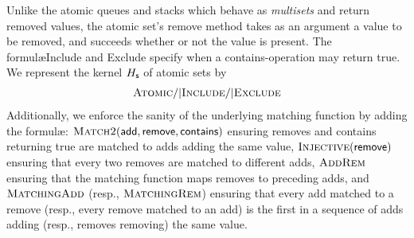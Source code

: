 \begin{example}

  Unlike the atomic queues and stacks which behave as \emph{multisets} and
  return removed values, the atomic set's {\sf remove} method takes as an
  argument a value to be removed, and succeeds whether or not the value is
  present. The formul\ae {\sc Include} and {\sc Exclude} specify when a {\sf
  contains}-operation may return {\sf true}. We represent the kernel $H_{\sf s}$
  of atomic sets by  
  \begin{align*}
    \textsc{Atomic} /| \textsc{Include} /| \textsc{Exclude}
  \end{align*}
  Additionally, we enforce the sanity of the underlying matching function by
  adding the formul\ae: $\textsc{Match2}({\sf add},{\sf
  remove},{\sf contains})$ ensuring removes and contains returning true
  are matched to adds adding the same value, $\textsc{Injective}({\sf remove})$ 
  ensuring that every two removes are matched to different adds,
  $\textsc{AddRem}$ ensuring that the matching function maps removes to preceding
  adds, and 
  $\textsc{MatchingAdd}$ (resp., $\textsc{MatchingRem}$) ensuring that every add matched to a remove
  (resp., every remove matched to an add) is the first in a sequence of adds adding 
  (resp., removes removing) the same value.

\end{example}

